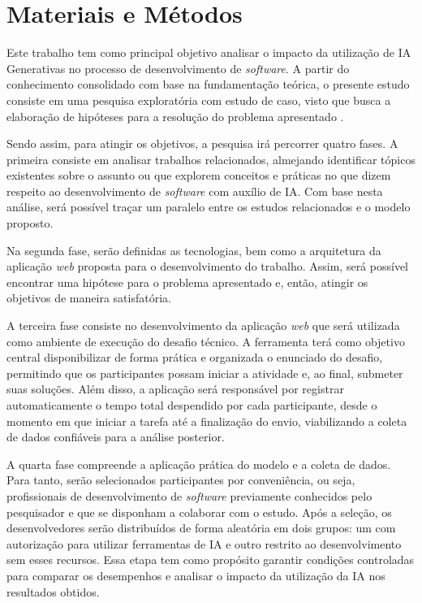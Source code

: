 \documentclass[english,brazilian]{UNISINOSartigo} %
\begin{document}
\section{Materiais e Métodos}

Este trabalho tem como principal objetivo analisar o impacto da utilização de IA Generativas no processo de desenvolvimento de \textit{software}. A partir do conhecimento consolidado com base na fundamentação teórica, o presente estudo consiste em uma pesquisa exploratória com estudo de caso, visto que busca a elaboração de hipóteses para a resolução do problema apresentado \cite{wazlawick2020}.

Sendo assim, para atingir os objetivos, a pesquisa irá percorrer quatro fases. A primeira consiste em analisar trabalhos relacionados, almejando identificar tópicos existentes sobre o assunto ou que explorem conceitos e práticas no que dizem respeito ao desenvolvimento de \textit{software} com auxílio de IA. Com base nesta análise, será possível traçar um paralelo entre os estudos relacionados e o modelo proposto.

Na segunda fase, serão definidas as tecnologias, bem como a arquitetura da aplicação \textit{web} proposta para o desenvolvimento do trabalho. Assim, será possível encontrar uma hipótese para o problema apresentado e, então, atingir os objetivos de maneira satisfatória.

A terceira fase consiste no desenvolvimento da aplicação \textit{web} que será utilizada como ambiente de execução do desafio técnico. A ferramenta terá como objetivo central disponibilizar de forma prática e organizada o enunciado do desafio, permitindo que os participantes possam iniciar a atividade e, ao final, submeter suas soluções. Além disso, a aplicação será responsável por registrar automaticamente o tempo total despendido por cada participante, desde o momento em que iniciar a tarefa até a finalização do envio, viabilizando a coleta de dados confiáveis para a análise posterior.

A quarta fase compreende a aplicação prática do modelo e a coleta de dados. Para tanto, serão selecionados participantes por conveniência, ou seja, profissionais de desenvolvimento de \textit{software} previamente conhecidos pelo pesquisador e que se disponham a colaborar com o estudo. Após a seleção, os desenvolvedores serão distribuídos de forma aleatória em dois grupos: um com autorização para utilizar ferramentas de IA e outro restrito ao desenvolvimento sem esses recursos. Essa etapa tem como propósito garantir condições controladas para comparar os desempenhos e analisar o impacto da utilização da IA nos resultados obtidos.
\end{document}
